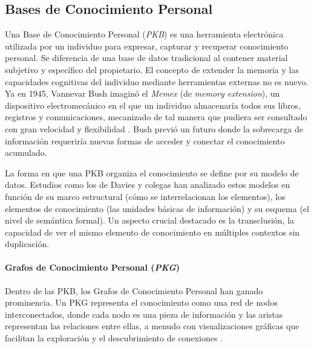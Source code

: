 \subsection{Bases de Conocimiento Personal}
\label{subsec:pkb}
Una Base de Conocimiento Personal (\textit{PKB}) es una herramienta electrónica utilizada por un individuo para expresar, capturar y recuperar conocimiento personal. Se diferencia de una base de datos tradicional al contener material subjetivo y específico del propietario. El concepto de extender la memoria y las capacidades cognitivas del individuo mediante herramientas externas no es nuevo. Ya en 1945, Vannevar Bush imaginó el \textit{Memex} (de \textit{memory extension}), un dispositivo electromecánico en el que un individuo almacenaría todos sus libros, registros y comunicaciones, mecanizado de tal manera que pudiera ser consultado con gran velocidad y flexibilidad \parencite{bushWeMayThink1945}. Bush previó un futuro donde la sobrecarga de información requeriría nuevas formas de acceder y conectar el conocimiento acumulado.

La forma en que una PKB organiza el conocimiento se define por su modelo de datos. Estudios como los de Davies y colegas \parencite{daviesBuildingMemexSixty2005, daviesStillBuildingMemex2011} han analizado estos modelos en función de su marco estructural (cómo se interrelacionan los elementos), los elementos de conocimiento (las unidades básicas de información) y su esquema (el nivel de semántica formal). Un aspecto crucial destacado es la transclusión, la capacidad de ver el mismo elemento de conocimiento en múltiples contextos sin duplicación.

\paragraph{Grafos de Conocimiento Personal (\textit{PKG})}
Dentro de las PKB, los Grafos de Conocimiento Personal han ganado prominencia. Un PKG representa el conocimiento como una red de nodos interconectados, donde cada nodo es una pieza de información y las aristas representan las relaciones entre ellas, a menudo con visualizaciones gráficas que facilitan la exploración y el descubrimiento de conexiones \parencite{pyneMetaworkHowWe2022}.

